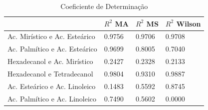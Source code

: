\begin{table}[H]
    \caption{Coeficiente de Determinação}
    \centering
    \begin{tabular}{l|p{3cm}p{3cm}p{3cm}}
    \hline
         & $R^2$ MA & $R^2$ MS & $R^2$ Wilson \\
    \hline
    Ac. Mirístico e Ac. Esteárico  & 0.9756  & 0.9706 & 0.9708 \\
    Ac. Palmítico e Ac. Esteárico  & 0.9699  & 0.8005 & 0.7040 \\
    Hexadecanol e Ac. Mirístico  & 0.2427  & 0.2328 & 0.2133 \\
    Hexadecanol e Tetradecanol  & 0.9804  & 0.9310 & 0.9887 \\
    Ac. Esteárico e Ac. Linoleico  & 0.1483  & 0.5592 & 0.8745 \\
    Ac. Palmítico e Ac. Linoleico  & 0.7490  & 0.5602 & 0.0000 \\
    \end{tabular}
    \label{tab:1}
\end{table}

